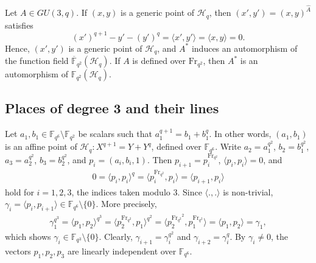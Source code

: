 \documentclass[11pt]{amsart}
\theoremstyle{plain}
\theoremstyle{definition}
\theoremstyle{remark}
\newcommand{\Frob}{{\mathrm{Fr}_{q^2}}}
\begin{document}
Let $A\in GU(3,q)$. If $(x,y)$ is a generic point of $\mathscr{H}_q$, then $(x',y')=(x,y)^{\hat{A}}$ satisfies 
\[(x')^{q+1}-y'-(y')^q=\langle x',y' \rangle = \langle x,y \rangle=0. \]
Hence, $(x',y')$ is a generic point of $\mathscr{H}_q$, and $A^*$ induces an automorphism of the function field $\overline{\mathbb{F}}_{q^2}(\mathscr{H}_q)$. If $A$ is defined over $\Frob$, then $A^*$ is an automorphism of $\mathbb{F}_{q^2}(\mathscr{H}_q)$. 



\subsection{Places of degree 3 and their lines} \label{ssec:places-lines}
Let $a_1,b_1 \in \mathbb{F}_{q^6}\setminus \mathbb{F}_{q^2}$ be scalars such that $a_1^{q+1}=b_1+b_1^q$. In other words, $(a_1,b_1)$ is an affine point of $\mathscr{H}_q:X^{q+1}=Y+Y^q$, defined over $\mathbb{F}_{q^6}$. Write $a_2=a_1^{q^2}$, $b_2=b_1^{q^2}$, $a_3=a_2^{q^2}$, $b_3=b_2^{q^2}$, and $p_i=(a_i,b_i,1)$. Then $p_{i+1}=p_i^\Frob$, $\langle p_i,p_i \rangle = 0$, and 
\begin{align*} %
0=\langle p_i,p_i \rangle ^q = \langle p_i^\Frob,p_i \rangle = \langle p_{i+1},p_i \rangle
\end{align*}
hold for $i=1,2,3$, the indices taken modulo $3$. Since $\langle .,. \rangle$ is non-trivial, $\gamma_i = \langle p_i,p_{i+1} \rangle \in \mathbb{F}_{q^6}\setminus \{0\}$. More precisely,
\begin{align*} %
\gamma_1^{q^3}=\langle p_1,p_{2} \rangle^{q^3} = \langle p_2^\Frob,p_{1} \rangle^{q^2} = \langle p_2^{\Frob^2},p_{1}^\Frob \rangle = \langle p_1,p_2 \rangle = \gamma_1,
\end{align*}
which shows $\gamma_i \in \mathbb{F}_{q^3}\setminus \{0\}$. Clearly, $\gamma_{i+1} = \gamma_i^{q^2}$ and $\gamma_{i+2} = \gamma_i^{q}$. By $\gamma_i\neq 0$, the vectors $p_1,p_2,p_3$ are linearly independent over $\mathbb{F}_{q^6}$. 
\end{document}
